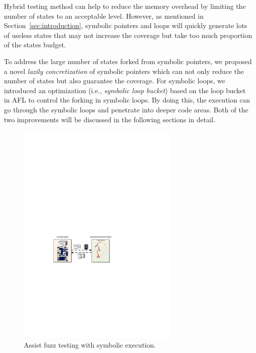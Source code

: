 Hybrid testing method can help to reduce the memory overhead by limiting the number of states to an acceptable level. However, as mentioned in Section~\ref{sec:introduction}, symbolic pointers and loops will quickly generate lots of useless states that may not increase the coverage but take too much proportion of the states budget.

To address the large number of states forked from symbolic pointers, we proposed a novel \textit{lazily concretization} of symbolic pointers which can not only reduce the number of states but also guarantee the coverage. 
For symbolic loops, we introduced an optimization (i.e., \textit{symbolic loop bucket}) based on the loop bucket in AFL to control the forking in symbolic loops. By doing this, the execution can go through the symbolic loops and penetrate into deeper code areas.
Both of the two improvements will be discussed in the following sections in detail.

\begin{figure}
\centering
\includegraphics[width=0.7\textwidth]{figures/s2e-assist.pdf} 
\caption{Assist fuzz testing with symbolic execution.}\label{s2e-assist}
\end{figure}


